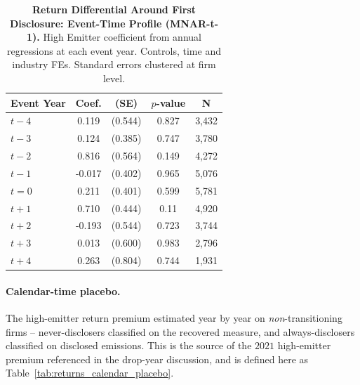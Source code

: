 \documentclass[a4paper,12pt]{article}
\begin{document}
\begin{table}[htbp]
\footnotesize\centering
\caption{\textbf{Return Differential Around First Disclosure: Event-Time Profile (MNAR-t-1).}
High Emitter coefficient from annual regressions at each event year.
Controls, time and industry FEs. Standard errors clustered at firm level.}
\label{tab:returns_eventtime_mnar}
\begin{tabular}{lcccc}
\toprule
Event Year & Coef. & (SE) & $p$-value & N \\
\midrule
$t-4$ & 0.119 & (0.544) & 0.827 & 3,432 \\
$t-3$ & 0.124 & (0.385) & 0.747 & 3,780 \\
$t-2$ & 0.816 & (0.564) & 0.149 & 4,272 \\
$t-1$ & -0.017 & (0.402) & 0.965 & 5,076 \\
$t=0$ & 0.211 & (0.401) & 0.599 & 5,781 \\
$t+1$ & 0.710 & (0.444) & 0.11 & 4,920 \\
$t+2$ & -0.193 & (0.544) & 0.723 & 3,744 \\
$t+3$ & 0.013 & (0.600) & 0.983 & 2,796 \\
$t+4$ & 0.263 & (0.804) & 0.744 & 1,931 \\
\bottomrule
\end{tabular}
\end{table}

\clearpage

\paragraph{Calendar-time placebo.} The high-emitter return premium estimated year
by year on \emph{non}-transitioning firms -- never-disclosers classified on the
recovered measure, and always-disclosers classified on disclosed emissions. This
is the source of the $2021$ high-emitter premium referenced in the drop-year
discussion, and is defined here as Table~\ref{tab:returns_calendar_placebo}.
\end{document}
